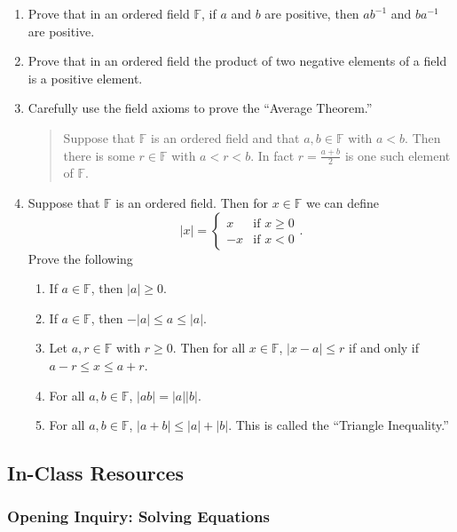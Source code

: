 \documentclass[11pt]{article}
\theoremstyle{definition}
\begin{document}
\begin{enumerate}
  \item Prove that in an ordered field $\mathbb{F}$, if $a$ and $b$ are positive, then $ab^{-1}$ and $ba^{-1}$ are positive.

  \item Prove that in an ordered field the product of two negative elements of a field is a positive element.


\item Carefully use the field axioms to prove the ``Average Theorem.''
  \begin{quotation}
    Suppose that $\mathbb{F}$ is an ordered field and that $a,b\in\mathbb{F}$ with $a<b$. Then there is some $r\in\mathbb{F}$ with
    $a < r < b$. In fact $r = \frac{a+b}{2}$ is one such element of $\mathbb{F}$.
  \end{quotation}

\item Suppose that $\mathbb{F}$ is an ordered field. Then for $x\in\mathbb{F}$ we can define
  \[ |x| = \begin{cases}
      x &\text{if }x\geq 0\\
      -x &\text{if }x < 0
  \end{cases}.\]
  Prove the following 
  \begin{enumerate}
    \item If $a\in\mathbb{F}$, then $|a| \geq 0$.
    \item If $a\in\mathbb{F}$, then $-|a|\leq a \leq |a|$.
    \item Let $a,r\in\mathbb{F}$ with $r\geq 0$. Then for all $x\in\mathbb{F}$, $|x-a|\leq r$ if and only if $a-r\leq x \leq a+r$.
    \item For all $a,b\in\mathbb{F}$, $|ab| = |a||b|$.
    \item For all $a,b\in\mathbb{F}$, $|a+b|\leq |a|+|b|$. This is called the ``Triangle Inequality.''
  \end{enumerate}
\end{enumerate}

\newpage \subsection{In-Class Resources}

\subsubsection{Opening Inquiry: Solving Equations}
\end{document}
